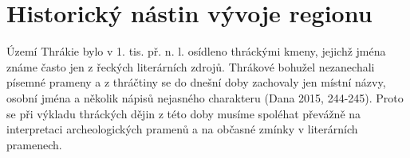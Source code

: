 
\section[historický-nástin-vývoje-regionu]{Historický nástin vývoje regionu}

Území Thrákie bylo v 1. tis. př. n. l. osídleno thráckými kmeny, jejichž jména známe často jen z řeckých literárních zdrojů. Thrákové bohužel nezanechali písemné prameny a z thráčtiny se do dnešní doby zachovaly jen místní názvy, osobní jména a několik nápisů nejasného charakteru (Dana 2015, 244-245). Proto se při výkladu thráckých dějin z této doby musíme spoléhat převážně na interpretaci archeologických pramenů a na občasné zmínky v literárních pramenech.

